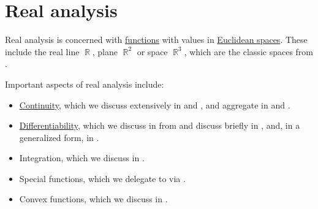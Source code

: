 \section{Real analysis}\label{sec:real_analysis}

Real analysis is concerned with \hyperref[def:function]{functions} with values in \hyperref[def:euclidean_space]{Euclidean spaces}. These include the real line \( \BbbR \), plane \( \BbbR^2 \) or space \( \BbbR^3 \), which are the classic spaces from .

Important aspects of real analysis include:
\begin{itemize}
  \item \hyperref[def:local_continuity]{Continuity}, which we discuss extensively in  and , and aggregate in  and .

  \item \hyperref[def:differentiability]{Differentiability}, which we discuss in  from  and discuss briefly in , and, in a generalized form, in .

  \item Integration, which we discuss in .

  \item Special functions, which we delegate to  via .

  \item Convex functions, which we discuss in .
\end{itemize}
